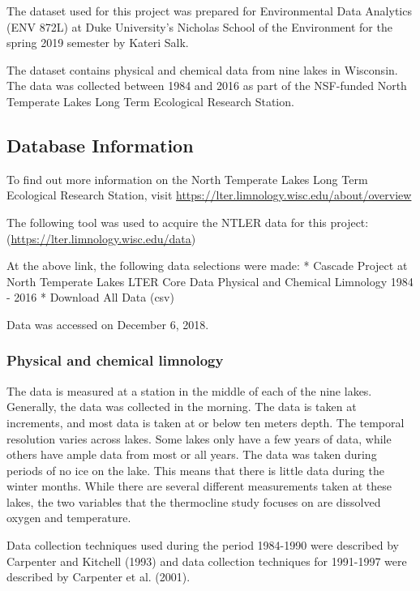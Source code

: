 \documentclass[12pt,]{article}
\begin{document}
The dataset used for this project was prepared for Environmental Data
Analytics (ENV 872L) at Duke University's Nicholas School of the
Environment for the spring 2019 semester by Kateri Salk.

The dataset contains physical and chemical data from nine lakes in
Wisconsin. The data was collected between 1984 and 2016 as part of the
NSF-funded North Temperate Lakes Long Term Ecological Research Station.

\subsection{Database Information}\label{database-information}

To find out more information on the North Temperate Lakes Long Term
Ecological Research Station, visit
\url{https://lter.limnology.wisc.edu/about/overview}

The following tool was used to acquire the NTLER data for this project:
(\url{https://lter.limnology.wisc.edu/data})

At the above link, the following data selections were made: * Cascade
Project at North Temperate Lakes LTER Core Data Physical and Chemical
Limnology 1984 - 2016 * Download All Data (csv)

Data was accessed on December 6, 2018.

\subsubsection{Physical and chemical
limnology}\label{physical-and-chemical-limnology}

The data is measured at a station in the middle of each of the nine
lakes. Generally, the data was collected in the morning. The data is
taken at increments, and most data is taken at or below ten meters
depth. The temporal resolution varies across lakes. Some lakes only have
a few years of data, while others have ample data from most or all
years. The data was taken during periods of no ice on the lake. This
means that there is little data during the winter months. While there
are several different measurements taken at these lakes, the two
variables that the thermocline study focuses on are dissolved oxygen and
temperature.

Data collection techniques used during the period 1984-1990 were
described by Carpenter and Kitchell (1993) and data collection
techniques for 1991-1997 were described by Carpenter et al. (2001).
\end{document}
